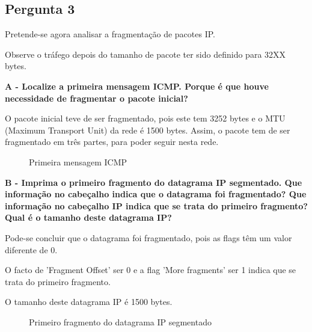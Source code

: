 \documentclass[11pt]{article}
\begin{document}
\clearpage
\subsection{Pergunta 3}

Pretende-se agora analisar a fragmentação de pacotes IP.

Observe o tráfego depois do tamanho de pacote ter sido  definido para 32XX bytes.

\vspace{0.5cm}

\textbf{A - Localize a primeira mensagem ICMP. Porque é que houve necessidade de fragmentar o pacote inicial? }

O pacote inicial teve de ser fragmentado, pois este tem 3252 bytes e o MTU (Maximum Transport Unit) da rede é 1500 bytes. Assim, o pacote tem de ser fragmentado em três partes, para poder seguir nesta rede.

\begin{figure}[hbt!]
    \centering
    \caption{Primeira mensagem ICMP}
\end{figure}

\vspace{0.5cm}

\textbf{B - Imprima o primeiro fragmento do datagrama IP segmentado. Que informação no cabeçalho indica que o datagrama foi fragmentado? Que informação no cabeçalho IP indica que se trata do primeiro fragmento? Qual é o tamanho deste datagrama IP?}

Pode-se concluir que o datagrama foi fragmentado, pois as flags têm um valor diferente de 0.

O facto de 'Fragment Offset' ser 0 e a flag 'More fragments' ser 1 indica que se trata do primeiro fragmento.

O tamanho deste datagrama IP é 1500 bytes.

\begin{figure}[hbt!]
    \centering
    \caption{Primeiro fragmento do datagrama IP segmentado}
\end{figure}
\end{document}
